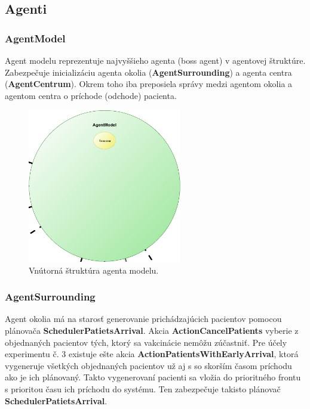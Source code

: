 \documentclass[letterpaper]{article}
\begin{document}
	\newpage
	
	\subsection{Agenti}
	
	\subsubsection{AgentModel}
	
	Agent modelu reprezentuje najvyššieho agenta (boss agent) v agentovej štruktúre. Zabezpečuje inicializáciu agenta okolia (\textbf{AgentSurrounding}) a agenta centra (\textbf{AgentCentrum}). Okrem toho iba preposiela správy medzi agentom okolia a agentom centra o príchode (odchode) pacienta.
	
	\vspace{0.8cm}
	
	\begin{figure}[hbt!]
		\centering
		\includegraphics[width=0.6\textwidth]{src/AgentModel}
		\caption{Vnútorná štruktúra agenta modelu.}
	\end{figure}

	\newpage
	
	\subsubsection{AgentSurrounding}
	
	Agent okolia má na starosť generovanie prichádzajúcich pacientov pomocou plánovača \textbf{SchedulerPatietsArrival}. Akcia \textbf{ActionCancelPatients} vyberie z objednaných pacientov tých, ktorý sa vakcinácie nemôžu zúčastniť. Pre účely experimentu č. 3 existuje ešte akcia \textbf{ActionPatientsWithEarlyArrival}, ktorá vygeneruje všetkých objednaných pacientov už aj s so skorším časom príchodu ako je ich plánovaný. Takto vygenerovaní pacienti sa vložia do prioritného frontu s prioritou času ich príchodu do systému. Ten zabezpečuje takisto plánovač \textbf{SchedulerPatietsArrival}.
	
\end{document}
